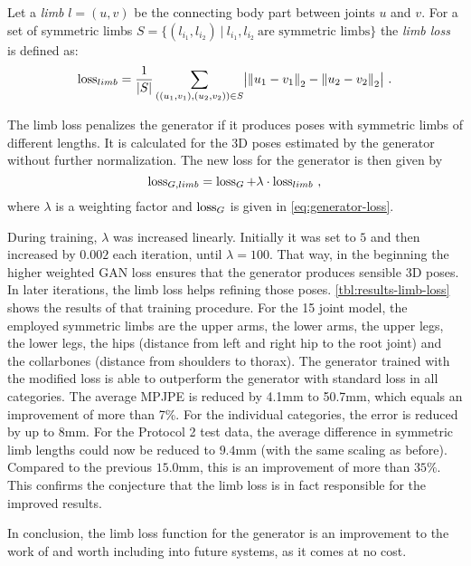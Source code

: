 Let a \emph{limb} $l = (u, v)$ be the connecting body part between joints $u$ and $v$.
For a set of symmetric limbs $S = \{(l_{i_1}, l_{i_2})~|~ l_{i_1}, l_{i_2}\ \text{are symmetric limbs} \}$ the \emph{limb loss} is defined as:
\begin{equation}
\operatorname{loss}_{limb} = \frac{1}{|S|}\sum_{((u_1, v_1), (u_2, v_2)) \in S} \bigl\lvert \norm{u_1 - v_1}_2 - \norm{u_2 - v_2}_2 \bigr\rvert \ .
\end{equation}

The limb loss penalizes the generator if it produces poses with symmetric limbs of different lengths.
It is calculated for the 3D poses estimated by the generator without further normalization.
The new loss for the generator is then given by
\begin{equation}
	\operatorname{loss}_{G, limb} = \operatorname{loss}_G + \lambda \cdot \operatorname{loss}_{limb} \ ,
\end{equation}
where $\lambda$ is a weighting factor and $\operatorname{loss}_G$ is given in \autoref{eq:generator-loss}.



During training, $\lambda$ was increased linearly.
Initially it was set to $5$ and then increased by $0.002$ each iteration, until $\lambda = 100$.
That way, in the beginning the higher weighted GAN loss ensures that the generator produces sensible 3D poses. 
In later iterations, the limb loss helps refining those poses.
\autoref{tbl:results-limb-loss} shows the results of that training procedure.
For the 15 joint model, the employed symmetric limbs are the upper arms, the lower arms, the upper legs, the lower legs, the hips (distance from left and right hip to the root joint) and the collarbones (distance from shoulders to thorax). 
The generator trained with the modified loss is able to outperform the generator with standard loss in all categories.
The average MPJPE is reduced by 4.1mm to 50.7mm, which equals an improvement of more than 7\%.
For the individual categories, the error is reduced by up to 8mm.
For the Protocol 2 test data, the average difference in symmetric limb lengths could now be reduced to $9.4$mm (with the same scaling as before).
Compared to the previous $15.0$mm, this is an improvement of more than $35\%$.
This confirms the conjecture that the limb loss is in fact responsible for the improved results.

In conclusion, the limb loss function for the generator is an improvement to the work of \citet{drover18} and worth including into future systems, as it comes at no cost.


